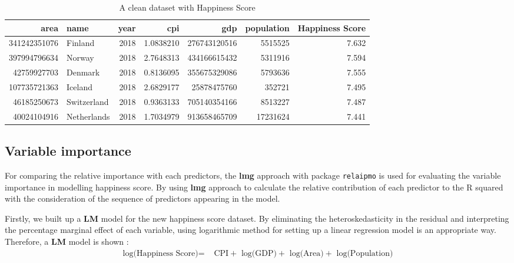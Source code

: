 \documentclass[11pt,a4paper,]{article}
\begin{document}
\begin{table}

\caption{\label{tab:tableHS}A clean dataset with Happiness Score}
\centering
\begin{tabular}[t]{r|l|r|r|r|r|r}
\hline
area & name & year & cpi & gdp & population & Happiness Score\\
\hline
341242351076 & Finland & 2018 & 1.0838210 & 276743120516 & 5515525 & 7.632\\
\hline
397994796634 & Norway & 2018 & 2.7648313 & 434166615432 & 5311916 & 7.594\\
\hline
42759927703 & Denmark & 2018 & 0.8136095 & 355675329086 & 5793636 & 7.555\\
\hline
107735721363 & Iceland & 2018 & 2.6829177 & 25878475760 & 352721 & 7.495\\
\hline
46185250673 & Switzerland & 2018 & 0.9363133 & 705140354166 & 8513227 & 7.487\\
\hline
40024104916 & Netherlands & 2018 & 1.7034979 & 913658465709 & 17231624 & 7.441\\
\hline
\end{tabular}
\end{table}

\clearpage

\hypertarget{variable-importance}{%
\subsection{Variable importance}\label{variable-importance}}

For comparing the relative importance with each predictors, the \textbf{lmg} approach with package \texttt{relaipmo} \autocite{relaimpo} is used for evaluating the variable importance in modelling happiness score. By using \textbf{lmg} approach to calculate the relative contribution of each predictor to the R squared with the consideration of the sequence of predictors appearing in the model.

Firstly, we built up a \textbf{LM} model for the new happiness score dataset. By eliminating the heteroskedasticity in the residual and interpreting the percentage marginal effect of each variable, using logarithmic method for setting up a linear regression model is an appropriate way. Therefore, a \textbf{LM} model is shown :
\begin{align*}
\text{log(Happiness Score)} = & \text{ CPI} +  \text{ log(GDP)}+\text{ log(Area)}+ \text{ log(Population)} 
\end{align*}
\end{document}
